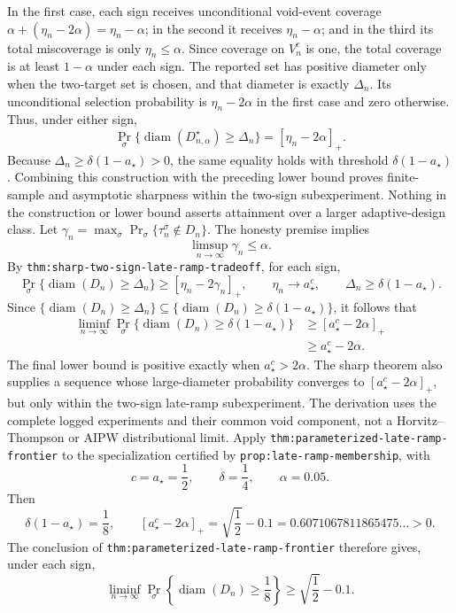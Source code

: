 In the first case, each sign receives unconditional void-event coverage
\(\alpha+(\eta_n-2\alpha)=\eta_n-\alpha\); in the second it receives \(\eta_n-\alpha\); and in the third its total miscoverage is only \(\eta_n\le\alpha\). Since coverage on \(V_n^c\) is one, the total coverage is at least \(1-\alpha\) under each sign. The reported set has positive diameter only when the two-target set is chosen, and that diameter is exactly \(\Delta_n\). Its unconditional selection probability is \(\eta_n-2\alpha\) in the first case and zero otherwise. Thus, under either sign,
\[
 \Pr_\sigma\{\operatorname{diam}(D_{n,\alpha}^\star)\ge\Delta_n\}
 =[\eta_n-2\alpha]_+.
\]
Because \(\Delta_n\ge\delta(1-a_\star)>0\), the same equality holds with threshold \(\delta(1-a_\star)\). Combining this construction with the preceding lower bound proves finite-sample and asymptotic sharpness within the two-sign subexperiment. Nothing in the construction or lower bound asserts attainment over a larger adaptive-design class.
Let \(\gamma_n=\max_{\sigma}\Pr_\sigma\{\tau_n^\sigma\notin D_n\}\). The honesty premise implies
\[
 \limsup_{n\to\infty}\gamma_n\le\alpha.
\]
By \texttt{thm:sharp-two-sign-late-ramp-tradeoff}, for each sign,
\[
 \Pr_\sigma\{\operatorname{diam}(D_n)\ge\Delta_n\}
 \ge[\eta_n-2\gamma_n]_+,
 \qquad
 \eta_n\to a_\star^c,
 \qquad
 \Delta_n\ge\delta(1-a_\star).
\]
Since
\(\{\operatorname{diam}(D_n)\ge\Delta_n\}\subseteq
\{\operatorname{diam}(D_n)\ge\delta(1-a_\star)\}\), it follows that
\[
 \begin{aligned}
 \liminf_{n\to\infty}
 \Pr_\sigma\{\operatorname{diam}(D_n)\ge\delta(1-a_\star)\}
 &\ge [a_\star^c-2\alpha]_+\\
 &\ge a_\star^c-2\alpha.
 \end{aligned}
\]
The final lower bound is positive exactly when \(a_\star^c>2\alpha\). The sharp theorem also supplies a sequence whose large-diameter probability converges to \([a_\star^c-2\alpha]_+\), but only within the two-sign late-ramp subexperiment. The derivation uses the complete logged experiments and their common void component, not a Horvitz--Thompson or AIPW distributional limit.
Apply \texttt{thm:parameterized-late-ramp-frontier} to the specialization certified by \texttt{prop:late-ramp-membership}, with
\[
 c=a_\star=\frac12,\qquad
 \delta=\frac14,\qquad
 \alpha=0.05.
\]
Then
\[
 \delta(1-a_\star)=\frac18,
 \qquad
 [a_\star^c-2\alpha]_+
 =\sqrt{\frac12}-0.1
 =0.6071067811865475\ldots>0.
\]
The conclusion of \texttt{thm:parameterized-late-ramp-frontier} therefore gives, under each sign,
\[
 \liminf_{n\to\infty}
 \Pr_\sigma\!\left\{\operatorname{diam}(D_n)\ge\frac18\right\}
 \ge\sqrt{\frac12}-0.1.
\]

